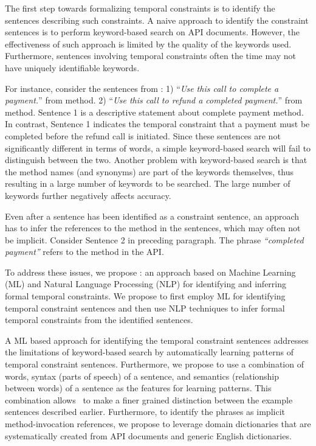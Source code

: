 The first step towards formalizing temporal constraints is to identify the sentences describing such constraints.
A naive approach to identify the constraint sentences is to perform keyword-based search on API documents.
However, the effectiveness of such approach is limited by the quality of the keywords used.
Furthermore, sentences involving temporal constraints often the time may not have uniquely identifiable keywords.

For instance, consider the sentences from \paypalAPI:
1) ``\textit{Use this call to complete a payment.}'' from  method.
2) ``\textit{Use this call to refund a completed payment.}'' from  method.
Sentence 1 is a descriptive statement about complete payment method.
In contrast, Sentence 1 indicates the temporal constraint that a payment must be completed before the refund call is initiated.
Since these sentences are not significantly different in terms of words, a simple keyword-based search will fail to distinguish between the two. 
Another problem with keyword-based search is that the method names (and synonyms) are part of the keywords themselves, thus resulting in a large number of keywords to be searched.
The large number of keywords further negatively affects accuracy.

Even after a sentence has been identified as a constraint sentence, an approach has to infer the references to the method in the sentences, which may often not be implicit. Consider Sentence 2 in preceding paragraph. The phrase \textit{``completed payment''} refers to the  method in the API.


To address these issues, we propose \tool: an approach based on Machine Learning (ML) and Natural Language Processing (NLP)
for identifying and inferring formal temporal constraints.
We propose to first employ ML for identifying temporal constraint sentences and then use NLP techniques to infer formal temporal constraints from the identified sentences. 

A ML based approach for identifying the temporal constraint sentences addresses the limitations of keyword-based search by automatically learning patterns of temporal constraint sentences.
Furthermore, we propose to use a combination of words, syntax (parts of speech) of a sentence, and semantics (relationship between words) of a sentence as the features for learning patterns.
This combination allows \tool\ to make a finer grained distinction between the example sentences described earlier.
Furthermore, to identify the phrases as implicit method-invocation references, we propose to leverage domain dictionaries that are systematically created from API documents and generic English dictionaries.


